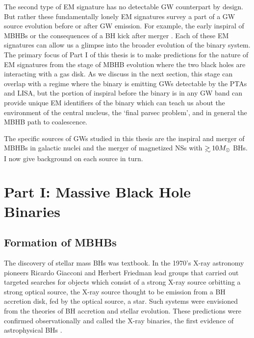The second type of EM signature has no detectable GW counterpart by design.
But rather these fundamentally lonely EM signatures survey a part of a GW
source evolution before or after GW emission. For example, the early inspiral
of MBHBs \citep[\emph{e.g.}][]{Haiman+2008, HKM09} or the consequences of a BH
kick after merger \citep[\emph{e.g.}][]{Rosotti:2012}. Each of these EM
signatures can allow us a glimpse into the broader evolution of the binary
system. The primary focus of Part I of this thesis is to make predictions for
the nature of EM signatures from the stage of MBHB evolution where the two
black holes are interacting with a gas disk. As we discuss in the next
section, this stage can overlap with a regime where the binary is emitting GWs
detectable by the PTAs and LISA, but the portion of inspiral before the binary
is in any GW band can provide unique EM identifiers of the binary which can
teach us about the environment of the central nucleus, the `final parsec
problem', and in general the MBHB path to coalescence.

The specific sources of GWs studied in this thesis are the inspiral and merger
of MBHBs in galactic nuclei and the merger of magnetized NSs with $\gsim 10
\Msun$ BHs. I now give background on each source in turn.






\section{Part I: Massive Black Hole Binaries} 
\subsection{Formation of MBHBs}     

The discovery of stellar mass BHs was textbook. In
the 1970's X-ray astronomy pioneers Ricardo Giacconi and Herbert Friedman lead
groups that carried out targeted searches for objects which consist of a
strong X-ray source orbitting a strong optical source, the X-ray source
thought to be emission from a BH accretion disk, fed by the optical source, a
star. Such systems were envisioned from the theories of BH accretion and
stellar evolution. These predictions were confirmed observationally and called
the X-ray binaries, the first evidence of astrophysical BHs 
\citep[an entertaining historical account is found in][]{ThorneBHsTimeWarps:CH8}. 

